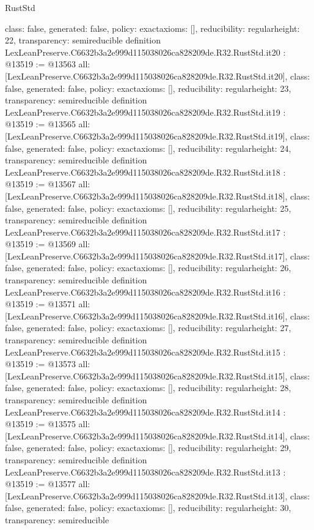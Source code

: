 \begin{lexlean}{RustStd}
\begin{coremodule}
{  class: false,
  generated: false,
  policy: exact{axioms: []},
  reducibility: regular{height: 22},
  transparency: semireducible
}
definition LexLeanPreserve.C6632b3a2e999d115038026ca828209de.R32.RustStd.it20 : @13519 := @13563 {
  all: [LexLeanPreserve.C6632b3a2e999d115038026ca828209de.R32.RustStd.it20],
  class: false,
  generated: false,
  policy: exact{axioms: []},
  reducibility: regular{height: 23},
  transparency: semireducible
}
definition LexLeanPreserve.C6632b3a2e999d115038026ca828209de.R32.RustStd.it19 : @13519 := @13565 {
  all: [LexLeanPreserve.C6632b3a2e999d115038026ca828209de.R32.RustStd.it19],
  class: false,
  generated: false,
  policy: exact{axioms: []},
  reducibility: regular{height: 24},
  transparency: semireducible
}
definition LexLeanPreserve.C6632b3a2e999d115038026ca828209de.R32.RustStd.it18 : @13519 := @13567 {
  all: [LexLeanPreserve.C6632b3a2e999d115038026ca828209de.R32.RustStd.it18],
  class: false,
  generated: false,
  policy: exact{axioms: []},
  reducibility: regular{height: 25},
  transparency: semireducible
}
definition LexLeanPreserve.C6632b3a2e999d115038026ca828209de.R32.RustStd.it17 : @13519 := @13569 {
  all: [LexLeanPreserve.C6632b3a2e999d115038026ca828209de.R32.RustStd.it17],
  class: false,
  generated: false,
  policy: exact{axioms: []},
  reducibility: regular{height: 26},
  transparency: semireducible
}
definition LexLeanPreserve.C6632b3a2e999d115038026ca828209de.R32.RustStd.it16 : @13519 := @13571 {
  all: [LexLeanPreserve.C6632b3a2e999d115038026ca828209de.R32.RustStd.it16],
  class: false,
  generated: false,
  policy: exact{axioms: []},
  reducibility: regular{height: 27},
  transparency: semireducible
}
definition LexLeanPreserve.C6632b3a2e999d115038026ca828209de.R32.RustStd.it15 : @13519 := @13573 {
  all: [LexLeanPreserve.C6632b3a2e999d115038026ca828209de.R32.RustStd.it15],
  class: false,
  generated: false,
  policy: exact{axioms: []},
  reducibility: regular{height: 28},
  transparency: semireducible
}
definition LexLeanPreserve.C6632b3a2e999d115038026ca828209de.R32.RustStd.it14 : @13519 := @13575 {
  all: [LexLeanPreserve.C6632b3a2e999d115038026ca828209de.R32.RustStd.it14],
  class: false,
  generated: false,
  policy: exact{axioms: []},
  reducibility: regular{height: 29},
  transparency: semireducible
}
definition LexLeanPreserve.C6632b3a2e999d115038026ca828209de.R32.RustStd.it13 : @13519 := @13577 {
  all: [LexLeanPreserve.C6632b3a2e999d115038026ca828209de.R32.RustStd.it13],
  class: false,
  generated: false,
  policy: exact{axioms: []},
  reducibility: regular{height: 30},
  transparency: semireducible
}
\end{coremodule}
\end{lexlean}
